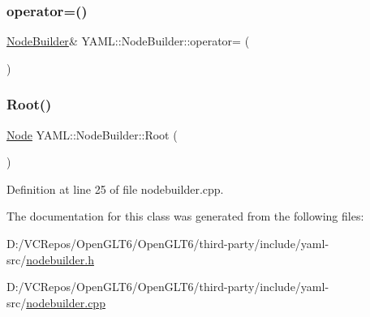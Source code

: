 \mbox{\label{class_y_a_m_l_1_1_node_builder_aeebc8aa910d1da025cc50118803ea406}} 
\subsubsection{\texorpdfstring{operator=()}{operator=()}\hspace{0.1cm}{\footnotesize\ttfamily [2/2]}}
{\footnotesize\ttfamily \mbox{\hyperlink{class_y_a_m_l_1_1_node_builder}{Node\+Builder}}\& Y\+A\+M\+L\+::\+Node\+Builder\+::operator= (\begin{DoxyParamCaption}\item[{\mbox{\hyperlink{class_y_a_m_l_1_1_node_builder}{Node\+Builder}} \&\&}]{ }\end{DoxyParamCaption})\hspace{0.3cm}{\ttfamily [delete]}}

\mbox{\label{class_y_a_m_l_1_1_node_builder_a04a3a526a145110393efac4905714bb1}} 
\subsubsection{\texorpdfstring{Root()}{Root()}}
{\footnotesize\ttfamily \mbox{\hyperlink{class_y_a_m_l_1_1_node}{Node}} Y\+A\+M\+L\+::\+Node\+Builder\+::\+Root (\begin{DoxyParamCaption}{ }\end{DoxyParamCaption})}



Definition at line 25 of file nodebuilder.\+cpp.



The documentation for this class was generated from the following files\+:\begin{DoxyCompactItemize}
\item 
D\+:/\+V\+C\+Repos/\+Open\+G\+L\+T6/\+Open\+G\+L\+T6/third-\/party/include/yaml-\/src/\mbox{\hyperlink{nodebuilder_8h}{nodebuilder.\+h}}\item 
D\+:/\+V\+C\+Repos/\+Open\+G\+L\+T6/\+Open\+G\+L\+T6/third-\/party/include/yaml-\/src/\mbox{\hyperlink{nodebuilder_8cpp}{nodebuilder.\+cpp}}\end{DoxyCompactItemize}
